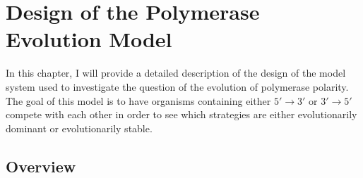 \chapter{Design of the Polymerase Evolution Model} %
\label{cha:design_of_the_polymerase_evolution_model}
In this chapter, I will provide a detailed description of the design of the model system used to investigate the question of the evolution of polymerase polarity. The goal of this model is to have organisms containing either $5'\to3'$ or $3'\to5'$ compete with each other in order to see which strategies are either evolutionarily dominant or evolutionarily stable.
\section*{Overview} %
\label{sec:overview}

